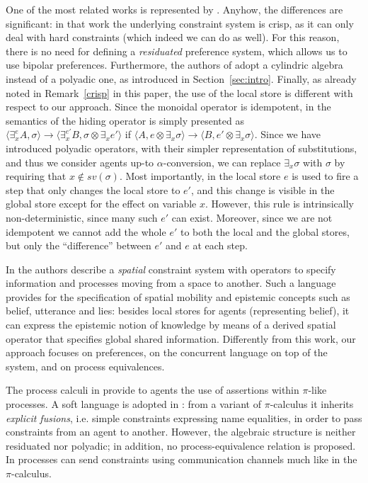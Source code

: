 \documentclass{llncs}
\begin{document}
One of the most related works is represented by \cite{pippo}. Anyhow, the differences are significant: in that work the underlying constraint system is crisp, as it can only deal with hard constraints (which indeed we can do as well). For this reason, there is no need for defining a \emph{residuated} preference system, which allows us to use bipolar preferences. Furthermore, the authors of \cite{pippo} adopt a cylindric algebra instead of a polyadic one, as introduced in Section~\ref{sec:intro}. Finally, as already noted in Remark~\ref{crisp} in this paper, the use of the local store is different with respect to our approach.
Since the monoidal operator is idempotent, in \cite{pippo} the semantics 
of the hiding operator is simply presented as $\langle 
\exists^{e}_x A, \sigma \rangle \to \langle  \exists^{e'}_x B, \sigma \otimes \exists_x e' \rangle$ if $\langle 
A, e \otimes \exists_x \sigma \rangle \to \langle  B, e' \otimes \exists_x \sigma \rangle$. 
Since we have introduced polyadic operators, with their simpler representation of substitutions, and thus we consider agents up-to $\alpha$-conversion,
we can replace $\exists_x \sigma$ with $\sigma$ by requiring that $x \not \in sv(\sigma)$.
Most importantly, in \cite{pippo} the local store $e$ is used to fire a step that only changes the local store to $e'$, and this change is  visible in the global store except  for the effect on variable $x$. However, this rule is intrinsically non-deterministic, since many such $e'$ can exist. Moreover, since we are not idempotent we cannot add the whole $e'$ to both the local and the global stores, but only the ``difference'' between $e'$ and $e$ at each step. 

In \cite{spatialvalencia} the authors describe a \emph{spatial} constraint system with operators to
specify information and processes moving from a space to another. Such a language provides for the specification of spatial mobility and epistemic concepts such as belief, utterance and lies: besides local stores for agents  (representing belief), it can express the epistemic notion of knowledge by means of a derived spatial operator that specifies global shared information. Differently from this work, our approach focuses on preferences, on the concurrent language on top of the system, and on process equivalences.

The process calculi in \cite{parrowlics,buscemi} provide  to agents the use of assertions within $\pi$-like processes. A soft language is adopted in \cite{buscemi}: from a variant of $\pi$-calculus it inherits \emph{explicit fusions}, i.e. simple constraints expressing name equalities, in order to pass constraints from an agent to another.
 However, the algebraic structure is neither residuated nor  polyadic; in addition, no process-equivalence relation is proposed.  In \cite{pi1,pi2}  processes can send constraints using communication channels much like in the $\pi$-calculus. 
 
\end{document}
